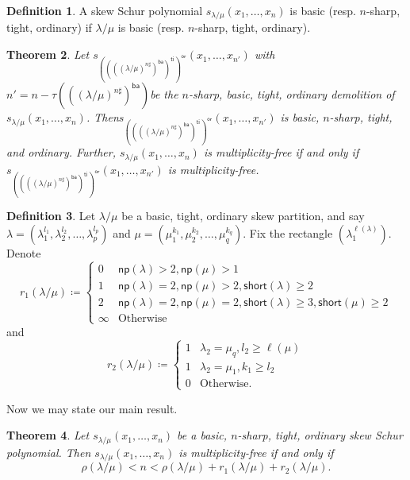 \documentclass[10pt]{article}
\newtheorem{theorem}{Theorem}[section]
\theoremstyle{definition}
\newtheorem{defi}[theorem]{Definition}
\newcommand{\np}{\mathsf{np}}
\newcommand{\ba}{\mathsf{ba}}
\newcommand{\ti}{\mathsf{ti}}
\newcommand{\orsf}{\mathsf{or}}
\newcommand{\short}{\mathsf{short}}
\begin{document}
\begin{defi}
A skew Schur polynomial $s_{\lambda / \mu}(x_1,\ldots,x_n)$ is basic (resp. $n$-sharp, tight, ordinary) if $\lambda / \mu$ is basic (resp. $n$-sharp, tight, ordinary). 
\end{defi}


\begin{theorem} 
\label{theorem:mainReduction}
Let $s_{((((\lambda / \mu)^{n\sharp})^{\ba })^{\ti })^{\orsf}}(x_1,\ldots,x_{n'})$ with $n' = n - \tau(((\lambda / \mu)^{n\sharp})^{\ba })$\break be the $n$-sharp, basic, tight, ordinary demolition of $s_{\lambda / \mu}(x_1,\ldots,x_n)$. Then\break $s_{((((\lambda / \mu)^{n\sharp})^{\ba })^{\ti })^{\orsf}}(x_1,\ldots,x_{n'})$ is basic, $n$-sharp, tight, and ordinary. Further,\break 
$s_{\lambda / \mu}(x_1,\ldots,x_n)$ is multiplicity-free if and only if $s_{((((\lambda / \mu)^{n\sharp})^{\ba })^{\ti })^{\orsf}}(x_1,\ldots,x_{n'})$ is multiplicity-free.
\end{theorem}

\begin{defi}
\label{def:r1andr2}
Let $\lambda/\mu$ be a basic, tight, ordinary skew partition, and say $\lambda = (\lambda_1^{l_1},\lambda_2^{l_2},\ldots,\lambda_p^{l_p})$ and $\mu = (\mu_1^{k_1},\mu_2^{k_2},\ldots,\mu_q^{k_q})$. Fix the rectangle $(\lambda_1^{\ell(\lambda)})$. Denote
\begin{equation}
r_1(\lambda/\mu) \coloneqq \begin{cases}
0 & \np (\lambda)>2, \np (\mu)> 1\\
1 & \np (\lambda)=2, \np (\mu)>2, \short (\lambda)\geq 2\\
2 & \np (\lambda)=2, \np (\mu)=2, \short (\lambda)\geq 3, \short (\mu)\geq 2\\
\infty & \text{Otherwise}
\end{cases}
\end{equation}
and
\begin{equation}
r_2(\lambda/\mu) \coloneqq \begin{cases}
1 & \lambda_2 = \mu_q, l_2 \geq \ell(\mu)\\
1 & \lambda_2 = \mu_1, k_1 \geq l_2\\
0 & \text{Otherwise}.
\end{cases}
\end{equation}
\end{defi}

Now we may state our main result.

\begin{theorem}
\label{theorem:mainResult}
Let $s_{\lambda / \mu}(x_1,\ldots,x_n)$ be a basic, $n$-sharp, tight, ordinary skew Schur polynomial. Then $s_{\lambda / \mu}(x_1,\ldots,x_n)$ is multiplicity-free if and only if
\begin{equation}
\rho(\lambda/\mu) < n < \rho(\lambda/\mu) + r_1(\lambda/\mu)+ r_2(\lambda/\mu).
\end{equation}
\end{theorem}
\end{document}
